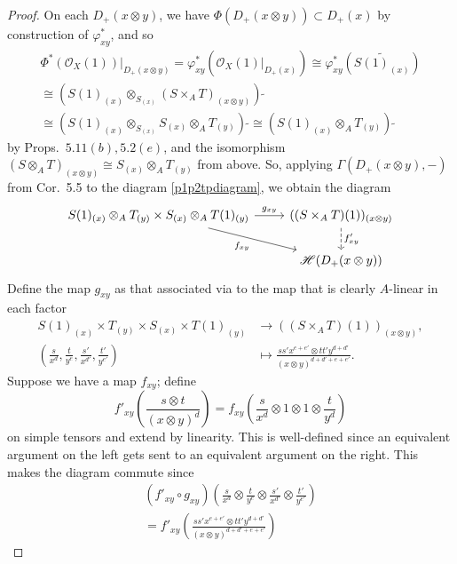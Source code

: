 \documentclass[10pt]{article}
\theoremstyle{definition}
\theoremstyle{remark}
\numberwithin{equation}{section}
\numberwithin{figure}{subsubsection}
\newcommand{\HH}{\mathscr{H}}
\newcommand{\OO}{\mathcal{O}}
\begin{document}
\begin{proof}
  On each $D_+(x \otimes y)$, we have $\Phi(D_+(x \otimes y)) \subset D_+(x)$ by construction of $\varphi_{xy}^*$, and so
  \begin{multline*}
    \Phi^*(\OO_X(1))\vert_{D_+(x \otimes y)} = \varphi_{xy}^*(\OO_X(1)\vert_{D_+(x)}) \cong \varphi_{xy}^*(\widetilde{S(1)_{(x)}})\\
    \cong (S(1)_{(x)} \otimes_{S_{(x)}} (S \times_A T)_{(x \otimes y)})\:\tilde{}\\
    \cong (S(1)_{(x)} \otimes_{S_{(x)}} S_{(x)} \otimes_A T_{(y)})\:\tilde{} \cong (S(1)_{(x)} \otimes_A T_{(y)})\:\tilde{}
  \end{multline*}
  by Props.~$5.11(b),5.2(e)$, and the isomorphism $(S \otimes_A T)_{(x \otimes y)} \cong S_{(x)} \otimes_A T_{(y)}$ from above. So, applying $\Gamma(D_+(x \otimes y),-)$ from Cor.~5.5 to the diagram \eqref{p1p2tpdiagram}, we obtain the diagram
  \begin{equation*}
    \begin{tikzcd}
      S(1)_{(x)} \otimes_A T_{(y)} \times S_{(x)} \otimes_A T(1)_{(y)} \rar{g_{xy}}\arrow{dr}[swap]{f_{xy}} & ((S \times_A T)(1))_{(x \otimes y)}\dar[dashed]{f'_{xy}}\\
      & \HH(D_+(x \otimes y))
    \end{tikzcd}
  \end{equation*}
  Define the map $g_{xy}$ as that associated via \cite[Props.~2.11, 2.12*]{AM69} to the map that is clearly $A$-linear in each factor
  \begin{align*}
    S(1)_{(x)} \times T_{(y)} \times S_{(x)} \times T(1)_{(y)} &\to ((S \times_A T)(1))_{(x \otimes y)},\\
    \left( \frac{s}{x^d},\frac{t}{y^e},\frac{s'}{x^{d'}},\frac{t'}{y^{e'}} \right) &\mapsto \frac{ss'x^{e+e'} \otimes tt'y^{d+d'}}{(x \otimes y)^{d+d'+e+e'}}.
  \end{align*}
  Suppose we have a map $f_{xy}$; define
  \begin{equation*}
    f'_{xy}\left( \frac{s \otimes t}{(x \otimes y)^{d}} \right) = f_{xy}\left( \frac{s}{x^{d}} \otimes 1 \otimes 1 \otimes \frac{t}{y^{d}} \right)
  \end{equation*}
  on simple tensors and extend by linearity. This is well-defined since an equivalent argument on the left gets sent to an equivalent argument on the right.  This makes the diagram commute since
  \begin{multline*}
    (f'_{xy} \circ g_{xy})\left( \frac{s}{x^{d}}\otimes\frac{t}{y^e}\otimes\frac{s'}{x^{d'}}\otimes\frac{t'}{y^{e'}} \right)\\ = f'_{xy}\left( \frac{ss'x^{e+e'} \otimes tt'y^{d+d'}}{(x \otimes y)^{d+d'+e+e'}} \right)

\end{multline*}
\end{proof}
\end{document}
